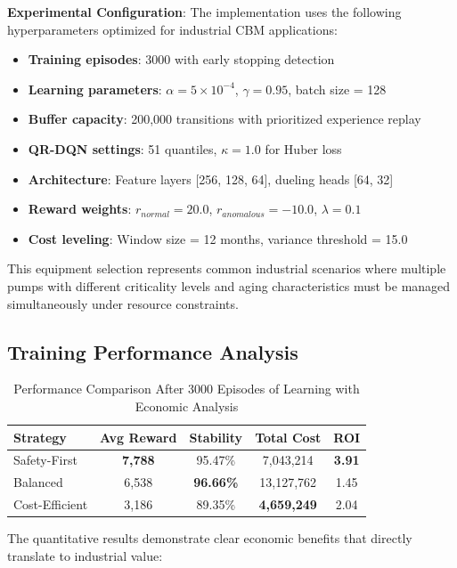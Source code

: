 \documentclass[twocolumn]{article}
\begin{document}
\textbf{Experimental Configuration}: The implementation uses the following hyperparameters optimized for industrial CBM applications:

\begin{itemize}
\item \textbf{Training episodes}: 3000 with early stopping detection
\item \textbf{Learning parameters}: $\alpha = 5 \times 10^{-4}$, $\gamma = 0.95$, batch size = 128
\item \textbf{Buffer capacity}: 200,000 transitions with prioritized experience replay
\item \textbf{QR-DQN settings}: 51 quantiles, $\kappa = 1.0$ for Huber loss
\item \textbf{Architecture}: Feature layers [256, 128, 64], dueling heads [64, 32]
\item \textbf{Reward weights}: $r_{normal} = 20.0$, $r_{anomalous} = -10.0$, $\lambda = 0.1$
\item \textbf{Cost leveling}: Window size = 12 months, variance threshold = 15.0
\end{itemize}

This equipment selection represents common industrial scenarios where multiple pumps with different criticality levels and aging characteristics must be managed simultaneously under resource constraints.

\subsection{Training Performance Analysis}

\begin{table}[htbp]
\caption{Performance Comparison After 3000 Episodes of Learning with Economic Analysis}
\centering
\small
\begin{tabular}{|l|c|c|c|c|}
\hline
Strategy & Avg Reward & Stability & Total Cost & ROI \\
\hline
Safety-First & \textbf{7,788} & 95.47\% & 7,043,214 & \textbf{3.91} \\
Balanced & 6,538 & \textbf{96.66\%} & 13,127,762 & 1.45 \\
Cost-Efficient & 3,186 & 89.35\% & \textbf{4,659,249} & 2.04 \\
\hline
\end{tabular}
\end{table}

The quantitative results demonstrate clear economic benefits that directly translate to industrial value:
\end{document}
